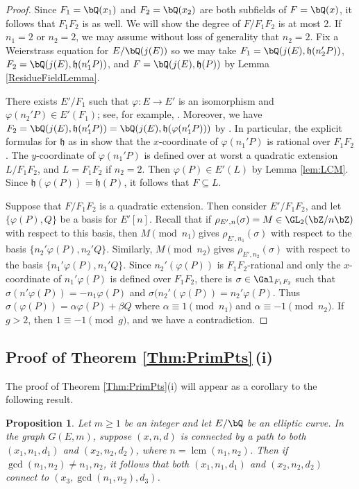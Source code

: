 \documentclass[11pt,reqno]{amsart}
\theoremstyle{plain}
\newtheorem{proposition}[theorem]{Proposition}
\theoremstyle{definition}
\DeclareMathOperator{\lcm}{lcm}
\newcommand{\Q}{\bQ}
\newcommand{\Z}{\bZ}
\newcommand{\abedit}[1]{{\color{blue} #1}}
\begin{document}
\begin{proof}
Since $F_1=\Q(x_1)$ and $F_2=\Q(x_2)$ are both subfields of $F=\Q(x)$, it follows that $F_1F_2$ is as well. We will show the degree of $F/F_1F_2$ is at most 2. If $n_1=2$ or $n_2=2$, we may assume without loss of generality that $n_2=2$. Fix a Weierstrass equation for $E/\Q(j(E))$ so we may take $F_1=\Q(j(E),\mathfrak{h}(n_2'P))$, $F_2=\Q(j(E),\mathfrak{h}(n_1'P))$, and $F=\Q(j(E),\mathfrak{h}(P))$ by Lemma \ref{ResidueFieldLemma}.

There exists $E'/F_1$ such that $\varphi:E \rightarrow E'$ is an isomorphism and $\varphi(n_2'P) \in E'(F_1)$; see, for example, \cite[p.~274, Proposition~VI.3.2]{DR}. Moreover, we have $F_2= \Q(j(E),\mathfrak{h}(n_1'P))=\Q(j(E),\mathfrak{h}(\varphi(n_1'P)))$ by \cite[p.~107]{shimura}. In particular, the explicit formulas for $\mathfrak{h}$ as in \cite[p.~107]{shimura} show that the $x$-coordinate of $\varphi(n_1'P)$ is rational over $F_1F_2$. The $y$-coordinate of $\varphi(n_1'P)$ is defined over at worst a quadratic extension $L/F_1F_2$, and $L=F_1F_2$ if $n_2=2$. Then $\varphi(P) \in E'(L)$ by Lemma \ref{lem:LCM}. Since $\mathfrak{h}(\varphi(P))=\mathfrak{h}(P)$, it follows that $F \subseteq L$.

Suppose that $F/F_1F_2$ is a quadratic extension. Then consider $E'/F_1F_2$, and let $\{\varphi(P),Q\}$ be a basis for $E'[n]$. Recall that if $\rho_{E',n}(\sigma)=M \in \GL_2(\Z/n\Z)$ with respect to this basis, then $M \pmod{n_1}$ gives $\rho_{E',n_1}(\sigma)$ with respect to the basis $\{n_2'\varphi(P),n_2'Q\}$. Similarly, $M\pmod{n_2}$ gives $\rho_{E',n_2}(\sigma)$ with respect to the basis $\{n_1'\varphi(P),n_1'Q\}$.  Since $n_2'(\varphi(P))$ is $F_1F_2$-rational and only the $x$-coordinate of $n_1'\varphi(P)$ is defined over $F_1F_2$, there is $\sigma\in \Gal_{F_1F_2}$ such that $\sigma(n'\varphi(P))=-n_1\varphi(P)$ and $\sigma(n_2'(\varphi(P))=n_2'\varphi(P)$. Thus $\sigma(\varphi(P))=\alpha \varphi(P)+\beta Q$ where $\alpha \equiv 1 \pmod{n_1}$ and $\alpha \equiv -1 \pmod{n_2}$. If $g>2$, then $1 \equiv -1 \pmod{g}$, and we have a contradiction.
\end{proof}

\subsection{Proof of Theorem \ref{Thm:PrimPts}\,(i)}
The proof of Theorem \ref{Thm:PrimPts}(i) will appear as a corollary to the following result.

\begin{proposition}\label{Prop:gcd}
Let $m\geq 1$ be an integer and let $E/\Q$ be an elliptic curve. In the graph $G(E,m)$,
suppose $(x,n,d)$ is connected by a path to both $(x_1,n_1,d_1)$ and $(x_2,n_2,d_2)$, where $n=\lcm(n_1,n_2)$. Then \abedit{if $\gcd(n_1,n_2) \neq n_1,n_2$}, it follows that both $(x_1,n_1,d_1)$ and $(x_2,n_2,d_2)$ connect to $(x_3, \gcd(n_1,n_2),d_3)$.

\end{proposition}
\end{document}
